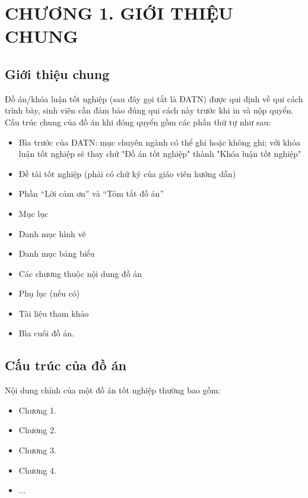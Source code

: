\documentclass{thesis}
\begin{document}
{\let\oldnumberline\numberline
    \renewcommand{\numberline}{Bảng~\oldnumberline}
        \listoftables}
\newpage


    \section*{CHƯƠNG 1. GIỚI THIỆU CHUNG} 

\setcounter{section}{1} 
    \setcounter{subsection}{0}
        \setcounter{figure}{0}
            \setcounter{table}{0}

\subsection{Giới thiệu chung}

Đồ án/khóa luận tốt nghiệp (sau đây gọi tắt là ĐATN) được qui định về qui cách trình bày, sinh viên cần đảm bảo đúng qui cách này trước khi in và nộp quyển. Cấu trúc chung của đồ án khi đóng quyển gồm các phần thứ tự như sau:
\begin{itemize}
    \item Bìa trước của ĐATN: mục chuyên ngành có thể ghi hoặc không ghi; với khóa luận tốt nghiệp sẽ thay chữ "Đồ án tốt nghiệp" thành "Khóa luận tốt nghiệp"
    \item Đề tài tốt nghiệp (phải có chữ ký của giáo viên hướng dẫn)
    \item Phần “Lời cảm ơn” và “Tóm tắt đồ án”
    \item Mục lục
    \item Danh mục hình vẽ
    \item Danh mục bảng biểu
    \item Các chương thuộc nội dung đồ án
    \item Phụ lục (nếu có)
    \item Tài liệu tham khảo
    \item Bìa cuối đồ án.
\end{itemize}

\subsection{Cấu trúc của đồ án}
Nội dung chính của một đồ án tốt nghiệp thường bao gồm:
\begin{itemize}
    \item Chương 1.
    \item Chương 2.
    \item Chương 3.
    \item Chương 4.
    \item ...
\end{itemize}
\end{document}
